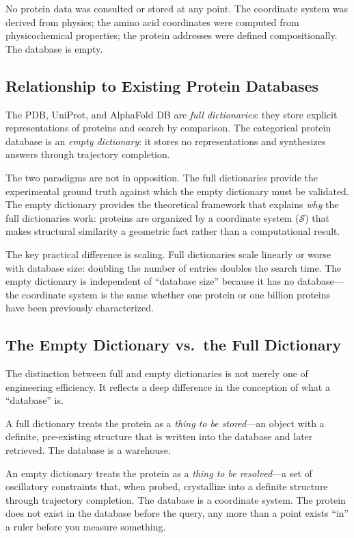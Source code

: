 \documentclass[11pt,twocolumn,a4paper]{article}
\theoremstyle{definition}
\theoremstyle{remark}
\newcommand{\Sspace}{\mathcal{S}}
\begin{document}
No protein data was consulted or stored at any point. The coordinate system was derived from physics; the amino acid coordinates were computed from physicochemical properties; the protein addresses were defined compositionally. The database is empty.

\subsection{Relationship to Existing Protein Databases}

The PDB, UniProt, and AlphaFold DB are \emph{full dictionaries}: they store explicit representations of proteins and search by comparison. The categorical protein database is an \emph{empty dictionary}: it stores no representations and synthesizes answers through trajectory completion.

The two paradigms are not in opposition. The full dictionaries provide the experimental ground truth against which the empty dictionary must be validated. The empty dictionary provides the theoretical framework that explains \emph{why} the full dictionaries work: proteins are organized by a coordinate system ($\Sspace$) that makes structural similarity a geometric fact rather than a computational result.

The key practical difference is scaling. Full dictionaries scale linearly or worse with database size: doubling the number of entries doubles the search time. The empty dictionary is independent of ``database size'' because it has no database---the coordinate system is the same whether one protein or one billion proteins have been previously characterized.

\subsection{The Empty Dictionary vs.\ the Full Dictionary}

The distinction between full and empty dictionaries is not merely one of engineering efficiency. It reflects a deep difference in the conception of what a ``database'' is.

A full dictionary treats the protein as a \emph{thing to be stored}---an object with a definite, pre-existing structure that is written into the database and later retrieved. The database is a warehouse.

An empty dictionary treats the protein as a \emph{thing to be resolved}---a set of oscillatory constraints that, when probed, crystallize into a definite structure through trajectory completion. The database is a coordinate system. The protein does not exist in the database before the query, any more than a point exists ``in'' a ruler before you measure something.
\end{document}
